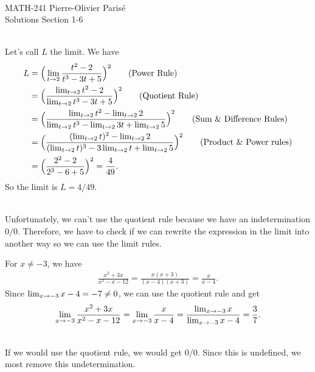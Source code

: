 


	\noindent \hrulefill \\
	MATH-241 \hfill Pierre-Olivier Paris{\'e}\\
	Solutions Section 1-6 \hfill \semester \\\vspace*{-1cm}
	
	\noindent\hrulefill
	
	\spc
	
	\\
	Let's call $L$ the limit.
	We have
		\begin{align*}
		L &= \Big( \lim_{t \rightarrow 2} \frac{t^2 - 2}{t^3 - 3t + 5} \Big)^2 \tag{Power Rule} \\
		&= \Big( \frac{\lim_{t \rightarrow 2} t^2 - 2}{\lim_{t \rightarrow 2} t^3 - 3t + 5} \Big)^2 \tag{Quotient Rule} \\
		&= \Big( \frac{\lim_{t \rightarrow 2} t^2 - \lim_{t \rightarrow 2} 2}{\lim_{t \rightarrow 2} t^3 -  \lim_{t \rightarrow 2} 3t + \lim_{t \rightarrow 2} 5} \Big)^2 \tag{Sum \& Difference Rules}  \\
		&= \Big( \frac{(\lim_{t \rightarrow 2} t)^2 - \lim_{t \rightarrow 2} 2}{(\lim_{t \rightarrow 2} t)^3 -  3\lim_{t \rightarrow 2} t + \lim_{t \rightarrow 2} 5} \Big)^2 \tag{Product \& Power rules} \\
		&= \Big( \frac{2^2 - 2}{2^3 - 6 + 5} \Big)^2 = \frac{4}{49} .
		\end{align*}
	So the limit is $L = 4/49$.
	
	\spc
	
	\\
	Unfortunately, we can't use the quotient rule because we have an indetermination $0/0$. Therefore, we have to check if we can rewrite the expression in the limit into another way so we can use the limit rules.
	
	For $x \neq -3$, we have
		\begin{align*}
		\frac{x^2 + 3x}{x^2 - x - 12} = \frac{x (x + 3)}{(x - 4) (x + 3)} = \frac{x}{x - 4} .
		\end{align*}
	Since $\lim_{x \rightarrow -3} x - 4 = -7 \neq 0$, we can use the quotient rule and get
		\begin{align*}
		\lim_{x \rightarrow -3} \frac{x^2 + 3x}{x^2 - x - 12} = \lim_{x \rightarrow -3} \frac{x}{x - 4} = \frac{\lim_{x \rightarrow -3} x}{\lim_{x \rightarrow -3} x - 4} = \frac{3}{7} .
		\end{align*}
		
	\spc
	
	\\
	If we would use the quotient rule, we would get $0/0$. Since this is undefined, we most remove this undetermination.
	
